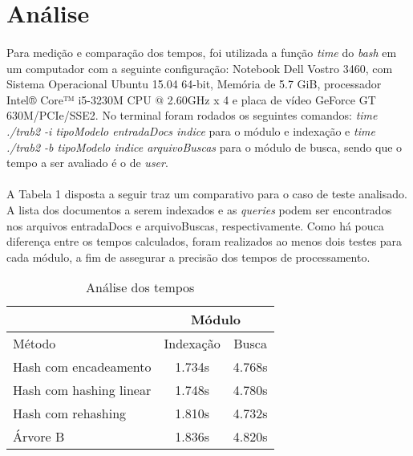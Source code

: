 \documentclass[12pt,a4paper]{article}
\begin{document}
  
 \newpage
 \section{Análise}	
  {\paragraph{} Para medição e comparação dos tempos, foi utilizada a função \emph{time} do {\it bash} em um computador com a seguinte configuração: Notebook Dell Vostro 3460, com Sistema Operacional Ubuntu 15.04 64-bit, Memória de 5.7 GiB, processador Intel® Core™ i5-3230M CPU @ 2.60GHz x 4 e placa de vídeo GeForce GT 630M/PCIe/SSE2. No terminal foram rodados os seguintes comandos: \emph{time ./trab2 -i tipoModelo entradaDocs indice} para o módulo e indexação e \emph{time ./trab2 -b tipoModelo indice arquivoBuscas} para o módulo de busca, sendo que o tempo a ser avaliado é o de \emph{user}.}
  {\paragraph{} A Tabela 1 disposta a seguir traz um comparativo para o caso de teste analisado. A lista dos documentos a serem indexados e as \emph{queries} podem ser encontrados nos arquivos entradaDocs e arquivoBuscas, respectivamente. Como há pouca diferença entre os tempos calculados, foram realizados ao menos dois testes para cada módulo, a fim de assegurar a precisão dos tempos de processamento.}
  
\begin{table}[!h]
\centering
\caption{Análise dos tempos}
\label{my-label}
\begin{tabular}{l|c|c|}
\cline{2-3}
                                              & \multicolumn{2}{c|}{Módulo} \\ \hline
\multicolumn{1}{|l|}{Método}                  & Indexação      & Busca      \\ \hline
\multicolumn{1}{|l|}{Hash com encadeamento}   & 1.734s              & 4.768s  \\ \hline
\multicolumn{1}{|l|}{Hash com hashing linear} & 1.748s              & 4.780s  \\ \hline
\multicolumn{1}{|l|}{Hash com rehashing}      & 1.810s              & 4.732s  \\ \hline
\multicolumn{1}{|l|}{Árvore B}                & 1.836s              & 4.820s  \\ \hline
\end{tabular}
\end{table}
\end{document}

